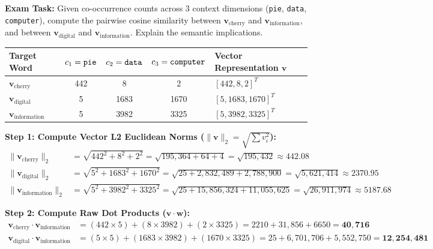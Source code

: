 \documentclass[10pt,a4paper]{article}
\begin{document}
\begin{examplebox}
\footnotesize
\textbf{Exam Task:} Given co-occurrence counts across 3 context dimensions (\texttt{pie}, \texttt{data}, \texttt{computer}), compute the pairwise cosine similarity between $\mathbf{v}_{\text{cherry}}$ and $\mathbf{v}_{\text{information}}$, and between $\mathbf{v}_{\text{digital}}$ and $\mathbf{v}_{\text{information}}$. Explain the semantic implications.

\vspace{1pt}
\centering
\begin{tabular}{l ccc >{\bfseries}l}
\toprule
\textbf{Target Word} & $c_1 = \text{\texttt{pie}}$ & $c_2 = \text{\texttt{data}}$ & $c_3 = \text{\texttt{computer}}$ & Vector Representation $\mathbf{v}$ \\
\midrule
$\mathbf{v}_{\text{cherry}}$      & 442 & 8    & 2    & $[442, 8, 2]^T$ \\
$\mathbf{v}_{\text{digital}}$     & 5   & 1683 & 1670 & $[5, 1683, 1670]^T$ \\
$\mathbf{v}_{\text{information}}$ & 5   & 3982 & 3325 & $[5, 3982, 3325]^T$ \\
\bottomrule
\end{tabular}

\vspace{2pt}
\flushleft
\textbf{Step 1: Compute Vector L2 Euclidean Norms ($\|\mathbf{v}\|_2 = \sqrt{\sum v_i^2}$):}
\begin{align*}
    \|\mathbf{v}_{\text{cherry}}\|_2      &= \sqrt{442^2 + 8^2 + 2^2} = \sqrt{195{,}364 + 64 + 4} = \sqrt{195{,}432} \approx \mathbf{442.08} \\
    \|\mathbf{v}_{\text{digital}}\|_2     &= \sqrt{5^2 + 1683^2 + 1670^2} = \sqrt{25 + 2{,}832{,}489 + 2{,}788{,}900} = \sqrt{5{,}621{,}414} \approx \mathbf{2370.95} \\
    \|\mathbf{v}_{\text{information}}\|_2 &= \sqrt{5^2 + 3982^2 + 3325^2} = \sqrt{25 + 15{,}856{,}324 + 11{,}055{,}625} = \sqrt{26{,}911{,}974} \approx \mathbf{5187.68}
\end{align*}

\textbf{Step 2: Compute Raw Dot Products ($\mathbf{v} \cdot \mathbf{w}$):}
\begin{align*}
    \mathbf{v}_{\text{cherry}} \cdot \mathbf{v}_{\text{information}}  &= (442 \times 5) + (8 \times 3982) + (2 \times 3325) = 2210 + 31{,}856 + 6650 = \mathbf{40{,}716} \\
    \mathbf{v}_{\text{digital}} \cdot \mathbf{v}_{\text{information}} &= (5 \times 5) + (1683 \times 3982) + (1670 \times 3325) = 25 + 6{,}701{,}706 + 5{,}552{,}750 = \mathbf{12{,}254{,}481}
\end{align*}


\end{examplebox}
\end{document}
